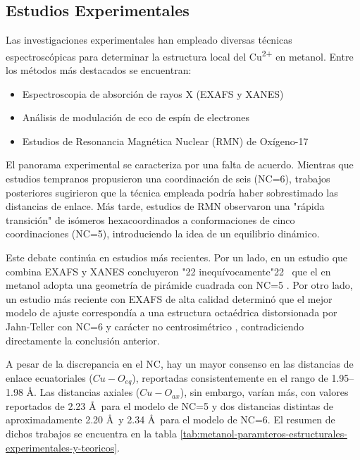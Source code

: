     \subsection*{Estudios Experimentales}

    Las investigaciones experimentales han empleado diversas técnicas espectroscópicas para determinar la estructura local del Cu\textsuperscript{2+} en metanol. Entre los métodos más destacados se encuentran:
    \begin{itemize}
        \item Espectroscopia de absorción de rayos X (EXAFS y XANES)
        \item Análisis de modulación de eco de espín de electrones
        \item Estudios de Resonancia Magnética Nuclear (RMN) de Oxígeno-17
    \end{itemize}

    El panorama experimental se caracteriza por una falta de acuerdo. Mientras que estudios tempranos \cite{Me-1980-01} propusieron una coordinación de seis (NC=6), trabajos posteriores sugirieron que la técnica empleada podría haber sobrestimado las distancias de enlace. Más tarde, estudios de RMN \cite{Me-1986-01} observaron una "rápida transición" de isómeros hexacoordinados a conformaciones de cinco coordinaciones (NC=5), introduciendo la idea de un equilibrio dinámico.

    Este debate continúa en estudios más recientes. Por un lado, en un estudio que combina EXAFS y XANES concluyeron \char"22 inequívocamente\char"22 \ que el  en metanol adopta una geometría de pirámide cuadrada con NC=5 \cite{Me-2012-01}. Por otro lado, un estudio más reciente con EXAFS de alta calidad determinó que el mejor modelo de ajuste correspondía a una estructura octaédrica distorsionada por Jahn-Teller con NC=6 y carácter no centrosimétrico \cite{Wa-2020-01}, contradiciendo directamente la conclusión anterior.

    A pesar de la discrepancia en el NC, hay un mayor consenso en las distancias de enlace ecuatoriales ($Cu-O_{eq}$), reportadas consistentemente en el rango de 1.95--1.98 \AA. Las distancias axiales ($Cu-O_{ax}$), sin embargo, varían más, con valores reportados de 2.23 \AA \ para el modelo de NC=5 y dos distancias distintas de aproximadamente 2.20 \AA \ y 2.34 \AA \ para el modelo de NC=6. El resumen de dichos trabajos se encuentra en la tabla \ref{tab:metanol-paramteros-estructurales-experimentales-y-teoricos}.

